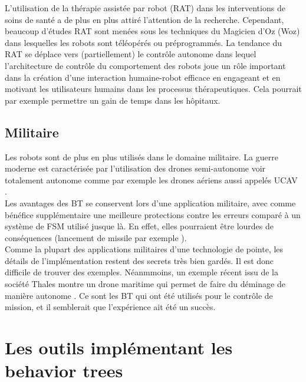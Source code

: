 \documentclass[titlepage]{article}
\begin{document}
		L’utilisation de la thérapie assistée par robot (RAT) dans les interventions de soins de santé a de plus en plus attiré l’attention de la recherche. Cependant, beaucoup d’études RAT sont menées sous les techniques du Magicien d’Oz (Woz) dans lesquelles les robots sont téléopérés ou préprogrammés. La tendance du RAT se déplace vers (partiellement) le contrôle autonome dans lequel l’architecture de contrôle du comportement des robots joue un rôle important dans la création d’une interaction humaine-robot efficace en engageant et en motivant les utilisateurs humains dans les processus thérapeutiques. \cite{rat} 
		Cela pourrait par exemple permettre un gain de temps dans les hôpitaux. 
	
		\subsection{Militaire}
		Les robots sont de plus en plus utilisés dans le domaine militaire. La guerre moderne est caractérisée par l'utilisation des drones semi-autonome voir totalement autonome comme par exemple les drones aériens aussi appelés UCAV \cite{wikipedia_UCAV}.
		\\
		Les avantages des BT se conservent lors d'une application militaire, avec comme bénéfice supplémentaire une meilleure protections contre les erreurs comparé à un système de FSM utilisé jusque là. En effet, elles pourraient être lourdes de conséquences (lancement de missile par exemple \cite{figaro_2018}).
		\\
		Comme la plupart des applications militaires d'une technologie de pointe, les détails de l'implémentation restent des secrets très bien gardés. Il est donc difficile de trouver des exemples.
		Néanmmoins, un exemple récent issu de la société Thales montre un drone maritime qui permet de faire du déminage de manière autonome \cite{mer_et_marine_2018}. Ce sont les BT qui ont été utilisés pour le contrôle de mission, et il semblerait que l'expérience ait été un succès.

	\section{Les outils implémentant les behavior trees}
\end{document}
